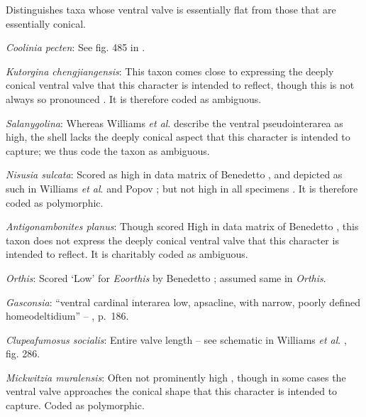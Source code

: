 \documentclass[]{book}
\theoremstyle{definition}
\theoremstyle{definition}
\theoremstyle{definition}
\theoremstyle{remark}
\begin{document}
Distinguishes taxa whose ventral valve is essentially flat from those
that are essentially conical.

\emph{Coolinia pecten}: See fig. 485 in
\citet{Williams2000BrachiopodaLinguliformea}.

\emph{Kutorgina chengjiangensis}: This taxon
\citetext{\citealp[see][fig.
129]{Williams2000BrachiopodaLinguliformea}; \citealp[fig.
1]{Popov1992TheCambrian}} comes close to expressing the deeply conical
ventral valve that this character is intended to reflect, though this is
not always so pronounced \citep[e.g.][fig.
125]{Williams2000BrachiopodaLinguliformea}. It is therefore coded as
ambiguous.

\emph{Salanygolina}: Whereas Williams \emph{et al}.
\citeyearpar[p.~156]{Williams2000BrachiopodaLinguliformea} describe the
ventral pseudointerarea as high, the shell lacks the deeply conical
aspect that this character is intended to capture; we thus code the
taxon as ambiguous.

\emph{Nisusia sulcata}: Scored as high in data matrix of Benedetto
\citeyearpar{Benedetto2009iChaniella}, and depicted as such in Williams
\emph{et al}. \citeyearpar[fig.
125]{Williams2000BrachiopodaLinguliformea} and Popov \citeyearpar[fig.
1]{Popov1992TheCambrian}; but not high in all specimens
\citep[e.g.][fig. 126]{Williams2000BrachiopodaLinguliformea}. It is
therefore coded as polymorphic.

\emph{Antigonambonites planus}: Though scored High in data matrix of
Benedetto \citeyearpar{Benedetto2009iChaniella}, this taxon
\citep[see][fig. 508]{Williams2000BrachiopodaLinguliformea} does not
express the deeply conical ventral valve that this character is intended
to reflect. It is charitably coded as ambiguous.

\emph{Orthis}: Scored `Low' for \emph{Eoorthis} by Benedetto
\citeyearpar{Benedetto2009iChaniella}; assumed same in \emph{Orthis}.

\emph{Gasconsia}: ``ventral cardinal interarea low, apsacline, with
narrow, poorly defined homeodeltidium'' --
\citet{Williams2000BrachiopodaLinguliformea}, p.~186.

\emph{Clupeafumosus socialis}: Entire valve length -- see schematic in
Williams \emph{et al}. \citeyearpar{Williams1997BrachiopodaRevised},
fig. 286.

\emph{Mickwitzia muralensis}: Often not prominently high
\citep{Skovsted2003EarlyCambrian, Balthasar2004Shellstructure}, though
in some cases \citep[e.g.][]{Butler2015Exceptionallypreserved} the
ventral valve approaches the conical shape that this character is
intended to capture. Coded as polymorphic.
\end{document}
